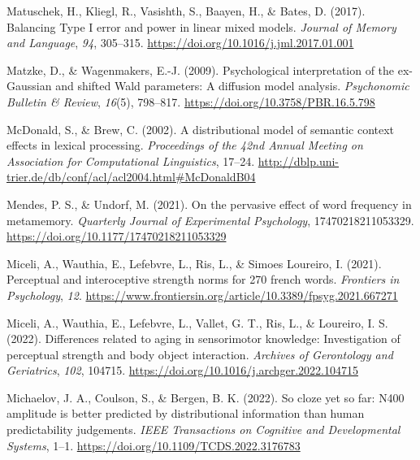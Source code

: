 \documentclass[
  12pt,
  man,floatsintext]{apa7}
\newlength{\cslhangindent}
\newlength{\cslentryspacingunit} %
\newenvironment{CSLReferences}[2] %
 {%
  \setlength{\parindent}{0pt}
  \ifodd #1
  \let\oldpar\par
  \def\par{\hangindent=\cslhangindent\oldpar}
  \fi
  \setlength{\parskip}{#2\cslentryspacingunit}
 }%
 {}
\begin{document}
\begin{CSLReferences}{1}{0}
\leavevmode{}%
Matuschek, H., Kliegl, R., Vasishth, S., Baayen, H., \& Bates, D. (2017). Balancing {Type I} error and power in linear mixed models. \emph{Journal of Memory and Language}, \emph{94}, 305--315. \url{https://doi.org/10.1016/j.jml.2017.01.001}

\leavevmode{}%
Matzke, D., \& Wagenmakers, E.-J. (2009). Psychological interpretation of the ex-{Gaussian} and shifted {Wald} parameters: {A} diffusion model analysis. \emph{Psychonomic Bulletin \& Review}, \emph{16}(5), 798--817. \url{https://doi.org/10.3758/PBR.16.5.798}

\leavevmode{}%
McDonald, S., \& Brew, C. (2002). A distributional model of semantic context effects in lexical processing. \emph{Proceedings of the 42nd Annual Meeting on Association for Computational Linguistics}, 17--24. \url{http://dblp.uni-trier.de/db/conf/acl/acl2004.html\#McDonaldB04}

\leavevmode{}%
Mendes, P. S., \& Undorf, M. (2021). On the pervasive effect of word frequency in metamemory. \emph{Quarterly Journal of Experimental Psychology}, 17470218211053329. \url{https://doi.org/10.1177/17470218211053329}

\leavevmode{}%
Miceli, A., Wauthia, E., Lefebvre, L., Ris, L., \& Simoes Loureiro, I. (2021). Perceptual and interoceptive strength norms for 270 french words. \emph{Frontiers in Psychology}, \emph{12}. \url{https://www.frontiersin.org/article/10.3389/fpsyg.2021.667271}

\leavevmode{}%
Miceli, A., Wauthia, E., Lefebvre, L., Vallet, G. T., Ris, L., \& Loureiro, I. S. (2022). Differences related to aging in sensorimotor knowledge: {Investigation} of perceptual strength and body object interaction. \emph{Archives of Gerontology and Geriatrics}, \emph{102}, 104715. \url{https://doi.org/10.1016/j.archger.2022.104715}

\leavevmode{}%
Michaelov, J. A., Coulson, S., \& Bergen, B. K. (2022). So cloze yet so far: {N400} amplitude is better predicted by distributional information than human predictability judgements. \emph{IEEE Transactions on Cognitive and Developmental Systems}, 1--1. \url{https://doi.org/10.1109/TCDS.2022.3176783}


\end{CSLReferences}
\end{document}
